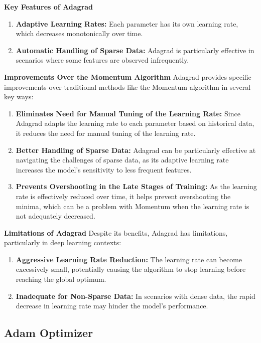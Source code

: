 \begin{qsolve}
\begin{qsolve}[]
        \textbf{Key Features of Adagrad}
        \begin{enumerate}
            \item \textbf{Adaptive Learning Rates:} Each parameter has its own learning rate, which decreases monotonically over time.
            \item \textbf{Automatic Handling of Sparse Data:} Adagrad is particularly effective in scenarios where some features are observed infrequently.
        \end{enumerate}
        \textbf{Improvements Over the Momentum Algorithm}
        Adagrad provides specific improvements over traditional methods like the Momentum algorithm in several key ways:
        \begin{enumerate}
            \item \textbf{Eliminates Need for Manual Tuning of the Learning Rate:} Since Adagrad adapts the learning rate to each parameter based on historical data, it reduces the need for manual tuning of the learning rate.
            \item \textbf{Better Handling of Sparse Data:} Adagrad can be particularly effective at navigating the challenges of sparse data, as its adaptive learning rate increases the model’s sensitivity to less frequent features.
            \item \textbf{Prevents Overshooting in the Late Stages of Training:} As the learning rate is effectively reduced over time, it helps prevent overshooting the minima, which can be a problem with Momentum when the learning rate is not adequately decreased.
        \end{enumerate}
        \textbf{Limitations of Adagrad}
        Despite its benefits, Adagrad has limitations, particularly in deep learning contexts:
        \begin{enumerate}
            \item \textbf{Aggressive Learning Rate Reduction:} The learning rate can become excessively small, potentially causing the algorithm to stop learning before reaching the global optimum.
            \item \textbf{Inadequate for Non-Sparse Data:} In scenarios with dense data, the rapid decrease in learning rate may hinder the model’s performance.
        \end{enumerate}
    \end{qsolve}
\end{qsolve}
\subsection{Adam Optimizer}

